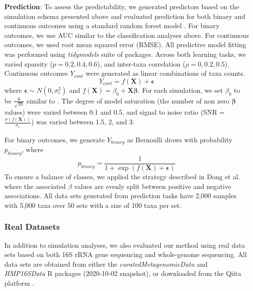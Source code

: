 \documentclass[10pt,letterpaper]{article}
\begin{document}
\noindent \textbf{Prediction}: To assess the predictability, we generated predictors based on the simulation schema presented above and evaluated prediction for both binary and continuous outcomes using a standard random forest model \cite{breiman2001}. For binary outcomes, we use AUC similar to the classification analyses above. For continuous outcomes, we used root mean squared error (RMSE). All predictive model fitting was performed using \emph{tidymodels} \cite{kuhn2020} suite of packages. Across both learning tasks, we varied sparsity ($p = 0.2, 0.4, 0.6$), and inter-taxa correlation ($\rho = 0, 0.2, 0.5$). Continuous outcomes $Y_{cont}$ were generated as linear combinations of taxa counts.  
\begin{equation}
    Y_{cont} = f(\mathbf{X}) + \mathbf{\epsilon}
\end{equation}
where $\mathbf{\epsilon} \sim N(0, \sigma_{\epsilon}^2)$ and $f(\mathbf{X}) = \beta_0 + \mathbf{X}\mathbf{\beta}$. For each simulation, we set $\beta_0$ to be $\frac{6}{\sqrt{10}}$ similar to \cite{xiao2018}. The degree of model saturation (the number of non zero $\mathbf{\beta}$ values) were varied between 0.1 and 0.5, and signal to noise ratio (SNR = $\frac{\sigma(f(\mathbf{X}))}{\sigma_{\epsilon}}$) was varied between 1.5, 2, and 3. 

For binary outcomes, we generate $Y_{binary}$ as Bernoulli draws with probability $p_{binary}$, where 
\begin{equation}
    p_{binary} = \frac{1}{1 + \exp(f(\mathbf{X}) + \mathbf{\epsilon})}
\end{equation}
To ensure a balance of classes, we applied the strategy described in Dong et al. \cite{dong2020} where the associated $\beta$ values are evenly split between positive and negative associations. All data sets generated from prediction tasks have 2,000 samples with 5,000 taxa over 50 sets with a size of 100 taxa per set.  

\subsubsection*{Real Datasets}

In addition to simulation analyses, we also evaluated our method using real data sets based on both 16S rRNA gene sequencing and whole-genome sequencing. All data sets are obtained from either the \emph{curatedMetagenomicData} \cite{pasolli2017} and \emph{HMP16SData} \cite{schiffer2019} R packages (2020-10-02 snapshot), or downloaded from the Qiita platform \cite{gonzalez2018}.  
\end{document}
